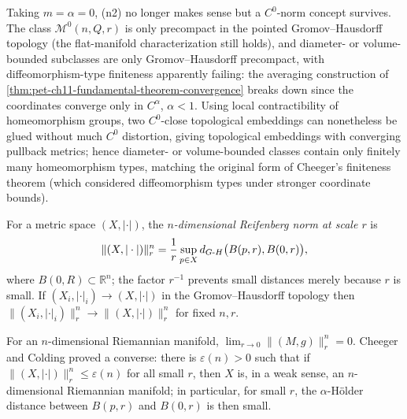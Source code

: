 \begin{remark}
  \label{rem:pet-ch11-c0-norm-precompactness-only}
  Taking $m=\alpha=0$, (n2) no longer makes sense but a $C^0$-norm concept
  survives. The class $\mathcal{M}^0(n,Q,r)$ is only precompact in the
  pointed Gromov--Hausdorff topology (the flat-manifold characterization
  still holds), and diameter- or volume-bounded subclasses are only
  Gromov--Hausdorff precompact, with diffeomorphism-type finiteness
  apparently failing: the averaging construction of
  \cref{thm:pet-ch11-fundamental-theorem-convergence} breaks down since the
  coordinates converge only in $C^{\alpha}$, $\alpha<1$. Using local
  contractibility of homeomorphism groups, two $C^0$-close topological
  embeddings can nonetheless be glued without much $C^0$ distortion, giving
  topological embeddings with converging pullback metrics; hence
  diameter- or volume-bounded classes contain only finitely many
  homeomorphism types, matching the original form of Cheeger's finiteness
  theorem (which considered diffeomorphism types under stronger coordinate
  bounds).
\end{remark}

\begin{definition}
  \label{def:pet-ch11-reifenberg-norm}
  For a metric space $(X,|\cdot|)$, the \emph{$n$-dimensional Reifenberg norm
  at scale $r$} is
  \[
    \|(X,|\cdot|)\|^n_r=\frac1r\sup_{p\in X}d_{G\text{-}H}\big(B(p,r),B(0,r)\big),
  \]
  where $B(0,R)\subset\mathbb{R}^n$; the factor $r^{-1}$ prevents small distances
  merely because $r$ is small. If $(X_i,|\cdot|_i)\to(X,|\cdot|)$ in the
  Gromov--Hausdorff topology then $\|(X_i,|\cdot|_i)\|^n_r\to\|(X,|\cdot|)\|^n_r$
  for fixed $n,r$.
\end{definition}

\begin{remark}
  \label{rem:pet-ch11-reifenberg-norm-properties}
  For an $n$-dimensional Riemannian manifold,
  $\lim_{r\to0}\|(M,g)\|^n_r=0$. Cheeger and Colding proved a converse: there
  is $\varepsilon(n)>0$ such that if $\|(X,|\cdot|)\|^n_r\le\varepsilon(n)$
  for all small $r$, then $X$ is, in a weak sense, an $n$-dimensional
  Riemannian manifold; in particular, for small $r$, the $\alpha$-Hölder
  distance between $B(p,r)$ and $B(0,r)$ is then small.
\end{remark}

